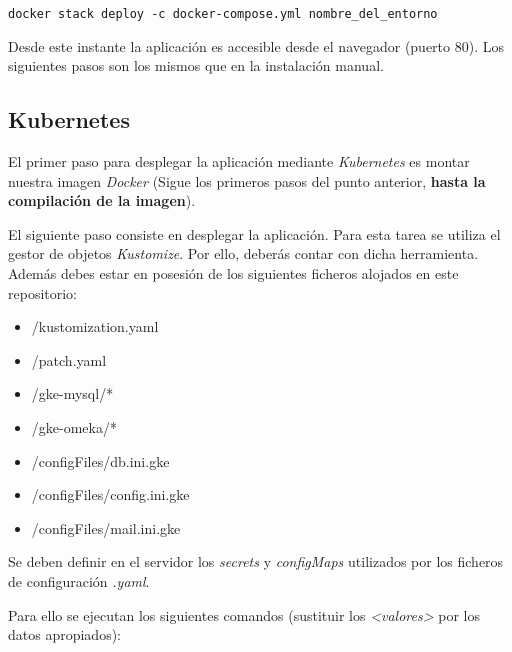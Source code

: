 \begin{verbatim}
docker stack deploy -c docker-compose.yml nombre_del_entorno
\end{verbatim} 

Desde este instante la aplicación es accesible desde el navegador
(puerto 80). Los siguientes pasos son los mismos que en la
instalación manual.

\subsection{Kubernetes}

El primer paso para desplegar la aplicación mediante \emph{Kubernetes}
es montar nuestra imagen \emph{Docker} (Sigue los primeros pasos del
punto anterior, \textbf{hasta la compilación de la imagen}).

El siguiente paso consiste en desplegar la aplicación. Para esta tarea
se utiliza el gestor de objetos \emph{Kustomize}. Por ello, deberás contar
con dicha herramienta. Además debes estar en posesión de los siguientes
ficheros alojados en este repositorio:

\begin{itemize}
\tightlist
\item
  /kustomization.yaml
\item
  /patch.yaml
\item
  /gke-mysql/*
\item
  /gke-omeka/*
\item
  /configFiles/db.ini.gke
\item
  /configFiles/config.ini.gke
\item
  /configFiles/mail.ini.gke
\end{itemize}

Se deben definir en el servidor los \emph{secrets} y \emph{configMaps} utilizados por los ficheros de configuración \emph{.yaml}.

Para ello se ejecutan los siguientes comandos (sustituir los \emph{<valores>} por los datos apropiados):

